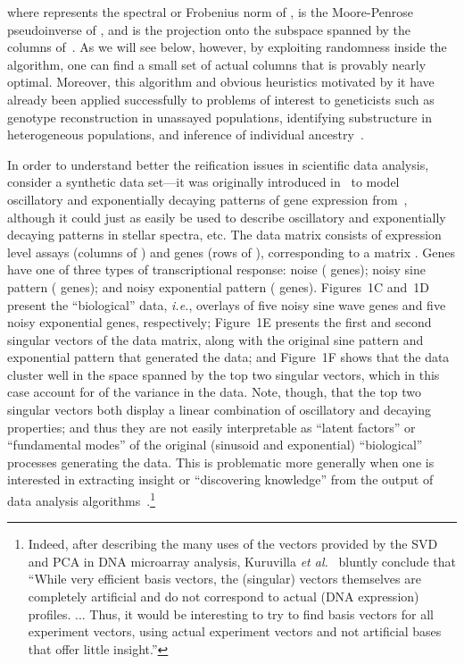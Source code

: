\documentclass[twoside]{article}
\begin{document}
where   represents the spectral or Frobenius norm
of ,  is the Moore-Penrose pseudoinverse of , and  is the projection onto the subspace spanned by 
the columns of~.
As we will see below, however, by exploiting randomness inside the 
algorithm, one can find a small set of actual columns that is provably 
nearly optimal.
Moreover, this algorithm and obvious heuristics motivated by it have already 
been applied successfully to problems of interest to geneticists such as 
genotype reconstruction in unassayed populations, identifying substructure 
in heterogeneous populations, and inference of individual 
ancestry~\cite{CUR_PNAS,Paschou07a,Paschou07b,Paschou08a,Paschou10a,Paschou10b,Paschou11a}.

In order to understand better the reification issues in scientific data 
analysis, consider a synthetic data set---it was originally introduced 
in~\cite{WRR03} to model oscillatory and exponentially decaying patterns of 
gene expression from~\cite{Cho_cellcycle_98}, although it could just as 
easily be used to describe oscillatory and exponentially decaying patterns 
in stellar spectra, etc.
The data matrix consists of  expression level assays (columns of ) and
 genes (rows of ), corresponding to a  matrix .
Genes have one of three types of transcriptional response:
noise ( genes); noisy sine pattern ( genes); and noisy exponential 
pattern ( genes).
Figures~1C and~1D present the ``biological'' data, \emph{i.e.}, overlays of 
five noisy sine wave genes and five noisy exponential genes, respectively;
Figure~1E presents the first and second singular vectors of the data matrix, 
along with the original sine pattern and exponential pattern that generated 
the data; and 
Figure~1F shows that the data cluster well in the space spanned by the top 
two singular vectors, which in this case account for  of the variance 
in the data. 
Note, though, that the top two singular vectors both display a linear combination of oscillatory and 
decaying properties; and thus they are not easily interpretable as ``latent
factors'' or ``fundamental modes'' of the original (sinusoid and exponential) 
``biological'' processes generating the data.
This is problematic more generally when one is interested in extracting 
insight or ``discovering knowledge'' from the output of data analysis 
algorithms~\cite{CUR_PNAS}.\footnote{Indeed, after describing the many uses of the vectors provided by 
the SVD and PCA in DNA microarray analysis, Kuruvilla 
\emph{et al.}~\cite{KPS02} bluntly conclude that 
``While very efficient basis vectors, the (singular) vectors 
themselves are completely artificial and do not correspond to actual (DNA
expression) profiles. ... Thus, it would be interesting to try to find basis 
vectors for all experiment vectors, using actual experiment vectors and not 
artificial bases that offer little insight.''}
\end{document}
